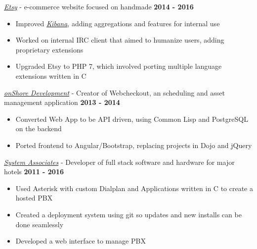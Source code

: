 \documentclass{res}
\begin{document}
\begin{resume}
\href{https://www.etsy.com/}{{\it Etsy}} - e-commerce website focused on handmade {\bf \hfill 2014 - 2016}
\begin{itemize}  \itemsep -2pt
    \item Improved \href{https://github.com/elasticsearch/kibana}{{\it Kibana}}, adding aggregations and features for internal use
    \item Worked on internal IRC client that aimed to humanize users, adding proprietary extensions
    \item Upgraded Etsy to PHP 7, which involved porting multiple language extensions written in C
\end{itemize}

\href{http://www.onshored.com}{{\it onShore Development}} - Creator of Webcheckout, an scheduling and asset management application {\bf \hfill 2013 - 2014 }
\begin{itemize}  \itemsep -2pt
    \item Converted Web App to be API driven, using Common Lisp and PostgreSQL on the backend
    \item Ported frontend to Angular/Bootstrap, replacing projects in Dojo and jQuery
\end{itemize}

\href{http://www.saicorporate.com}{{\it System Associates}} - Developer of full stack software and hardware for major hotels {\bf \hfill 2011 - 2016 }
\begin{itemize}  \itemsep -2pt
    \item Used Asterisk with custom Dialplan and Applications written in C to create a hosted PBX
    \item Created a deployment system using git so updates and new installs can be done seamlessly
    \item Developed a web interface to manage PBX
\end{itemize}


\end{resume}
\end{document}
